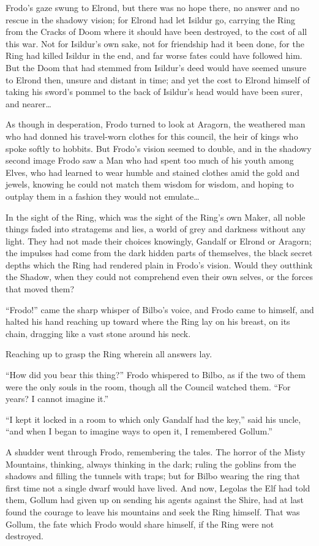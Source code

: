Frodo's gaze swung to Elrond, but there was no hope there, no answer and
no rescue in the shadowy vision; for Elrond had let Isildur go, carrying
the Ring from the Cracks of Doom where it should have been destroyed, to
the cost of all this war. Not for Isildur's own sake, not for friendship
had it been done, for the Ring had killed Isildur in the end, and far
worse fates could have followed him. But the Doom that had stemmed from
Isildur's deed would have seemed unsure to Elrond then, unsure and
distant in time; and yet the cost to Elrond himself of taking his
sword's pommel to the back of Isildur's head would have been surer, and
nearer\ldots{}

As though in desperation, Frodo turned to look at Aragorn, the weathered
man who had donned his travel-worn clothes for this council, the heir of
kings who spoke softly to hobbits. But Frodo's vision seemed to double,
and in the shadowy second image Frodo saw a Man who had spent too much
of his youth among Elves, who had learned to wear humble and stained
clothes amid the gold and jewels, knowing he could not match them wisdom
for wisdom, and hoping to outplay them in a fashion they would not
emulate\ldots{}

In the sight of the Ring, which was the sight of the Ring's own Maker,
all noble things faded into stratagems and lies, a world of grey and
darkness without any light. They had not made their choices knowingly,
Gandalf or Elrond or Aragorn; the impulses had come from the dark hidden
parts of themselves, the black secret depths which the Ring had rendered
plain in Frodo's vision. Would they outthink the Shadow, when they could
not comprehend even their own selves, or the forces that moved them?

``Frodo!'' came the sharp whisper of Bilbo's voice, and Frodo came to
himself, and halted his hand reaching up toward where the Ring lay on
his breast, on its chain, dragging like a vast stone around his neck.

Reaching up to grasp the Ring wherein all answers lay.

``How did you bear this thing?'' Frodo whispered to Bilbo, as if the two
of them were the only souls in the room, though all the Council watched
them. ``For years? I cannot imagine it.''

``I kept it locked in a room to which only Gandalf had the key,'' said
his uncle, ``and when I began to imagine ways to open it, I remembered
Gollum.''

A shudder went through Frodo, remembering the tales. The horror of the
Misty Mountains, thinking, always thinking in the dark; ruling the
goblins from the shadows and filling the tunnels with traps; but for
Bilbo wearing the ring that first time not a single dwarf would have
lived. And now, Legolas the Elf had told them, Gollum had given up on
sending his agents against the Shire, had at last found the courage to
leave his mountains and seek the Ring himself. That was Gollum, the fate
which Frodo would share himself, if the Ring were not destroyed.

